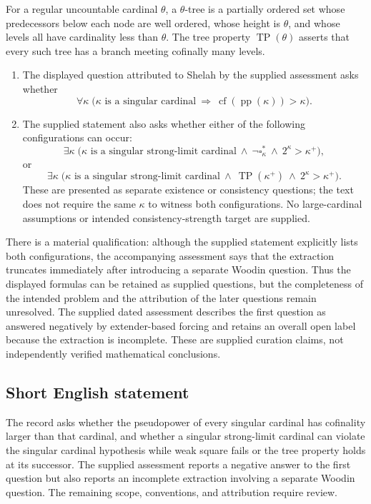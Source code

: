 \documentclass[11pt]{article}
\begin{document}
For a regular uncountable cardinal \(\theta\), a \(\theta\)-tree is a partially ordered set whose predecessors below each node are well ordered, whose height is \(\theta\), and whose levels all have cardinality less than \(\theta\). The tree property \(\operatorname{TP}(\theta)\) asserts that every such tree has a branch meeting cofinally many levels.

\begin{enumerate}
\item The displayed question attributed to Shelah by the supplied assessment asks whether
\[
\forall\kappa\;\bigl(\kappa\text{ is a singular cardinal}\ \Longrightarrow\ \operatorname{cf}(\operatorname{pp}(\kappa))>\kappa\bigr).
\]
\item The supplied statement also asks whether either of the following configurations can occur:
\[
\exists\kappa\;\bigl(\kappa\text{ is a singular strong-limit cardinal}\ \land\ \neg\square_\kappa^*\ \land\ 2^\kappa>\kappa^+\bigr),
\]
or
\[
\exists\kappa\;\bigl(\kappa\text{ is a singular strong-limit cardinal}\ \land\ \operatorname{TP}(\kappa^+)\ \land\ 2^\kappa>\kappa^+\bigr).
\]
These are presented as separate existence or consistency questions; the text does not require the same \(\kappa\) to witness both configurations. No large-cardinal assumptions or intended consistency-strength target are supplied.
\end{enumerate}

There is a material qualification: although the supplied statement explicitly lists both configurations, the accompanying assessment says that the extraction truncates immediately after introducing a separate Woodin question. Thus the displayed formulas can be retained as supplied questions, but the completeness of the intended problem and the attribution of the later questions remain unresolved. The supplied dated assessment describes the first question as answered negatively by extender-based forcing and retains an overall open label because the extraction is incomplete. These are supplied curation claims, not independently verified mathematical conclusions.
\subsection{Short English statement}
The record asks whether the pseudopower of every singular cardinal has cofinality larger than that cardinal, and whether a singular strong-limit cardinal can violate the singular cardinal hypothesis while weak square fails or the tree property holds at its successor. The supplied assessment reports a negative answer to the first question but also reports an incomplete extraction involving a separate Woodin question. The remaining scope, conventions, and attribution require review.
\end{document}
